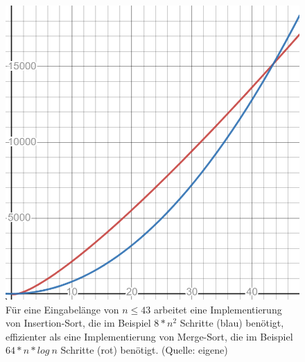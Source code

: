 \begin{figure}
    \begin{center}
        \includegraphics[scale=0.3]{chapters/7. Sortierverfahren/img/insertionvsmerge}
        \caption{Für eine Eingabelänge von $n\leq43$ arbeitet eine Implementierung von Insertion-Sort, die im Beispiel $8*n^2$ Schritte (blau) benötigt, effizienter als eine Implementierung von Merge-Sort, die im Beispiel $64*n*log\ n$ Schritte (rot) benötigt. (Quelle: eigene)}
        \label{fig:insertionvsmerge}
    \end{center}
\end{figure}